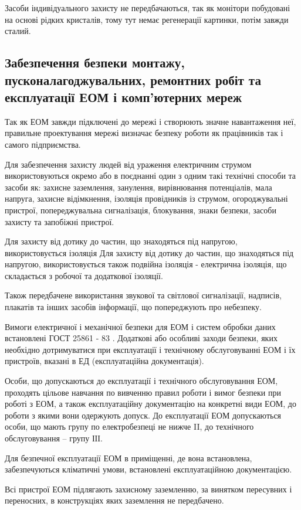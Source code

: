 \par Засоби індивідуального захисту не передбачаються, так як монітори побудовані на основі рідких кристалів, тому тут немає регенерації картинки, потім завжди сталий.



\subsection{Забезпечення безпеки монтажу, пусконалагоджувальних, ремонтних робіт та експлуатації ЕОМ і комп’ютерних мереж}

\par Так як ЕОМ завжди підключені до мережі і створюють значне навантаження неї, правильне проектування мережі визначає безпеку роботи як працівників так і самого підприємства.
\par Для забезпечення захисту людей від ураження електричним струмом використовуються окремо або в поєднанні один з одним такі технічні способи та засоби як: захисне заземлення, занулення, вирівнювання потенціалів, мала напруга, захисне відімкнення, ізоляція провідників із струмом, огороджувальні пристрої, попереджувальна сигналізація, блокування, знаки безпеки, засоби захисту та запобіжні пристрої.
\par Для захисту від дотику до частин, що знаходяться під напругою, використовується ізоляція Для захисту від дотику до частин, що знаходяться під напругою, використовується також подвійна ізоляція - електрична ізоляція, що складається з робочої та додаткової ізоляції.
\par Також передбачене використання звукової та світлової сигналізації, надписів, плакатів та інших засобів інформації, що попереджують про небезпеку.

\par Вимоги електричної і механічної безпеки для ЕОМ і систем обробки даних встановлені ГОСТ 25861 - 83 \cite{safety_gost_25861}. Додаткові або особливі заходи безпеки, яких необхідно дотримуватися при експлуатації і технічному обслуговуванні ЕОМ і їх пристроїв, вказані в ЕД (експлуатаційна документація).
\par Особи, що допускаються до експлуатації і технічного обслуговування ЕОМ, проходять цільове навчання по вивченню правил роботи і вимог безпеки при роботі з ЕОМ, а також експлуатаційну документацію на конкретні види ЕОМ, до роботи з якими вони одержують допуск. До експлуатації ЕОМ допускаються особи, що мають групу по електробезпеці не нижче II, до технічного обслуговування -- групу ІІІ.
\par Для безпечної експлуатації ЕОМ в приміщенні, де вона встановлена, забезпечуються кліматичні умови, встановлені експлуатаційною документацією.
\par Всі пристрої ЕОМ підлягають захисному заземленню, за винятком пересувних і переносних, в конструкціях яких заземлення не передбачено.

